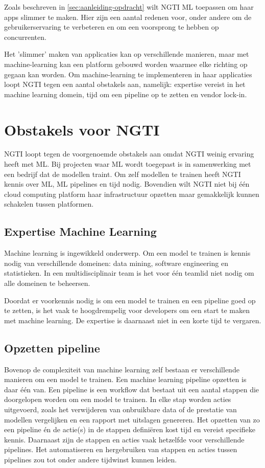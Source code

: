 Zoals beschreven in \autoref{sec:aanleiding-opdracht} wilt NGTI ML toepassen om haar apps slimmer te maken. Hier zijn een aantal redenen voor, onder andere om de gebruikerservaring te verbeteren en om een voorsprong te hebben op concurrenten.

Het 'slimmer' maken van applicaties kan op verschillende manieren, maar met machine-learning kan een platform gebouwd worden waarmee elke richting op gegaan kan worden. Om machine-learning te implementeren in haar applicaties loopt NGTI tegen een aantal obstakels aan, namelijk: expertise vereist in het machine learning domein, tijd om een pipeline op te zetten en vendor lock-in.

\section{Obstakels voor NGTI}\label{sec:obstakels-voor-ngti}
NGTI loopt tegen de voorgenoemde obstakels aan omdat NGTI weinig ervaring heeft met ML. Bij projecten waar ML wordt toegepast is in samenwerking met een bedrijf dat de modellen traint. Om zelf modellen te trainen heeft NGTI kennis over ML, ML pipelines en tijd nodig. Bovendien wilt NGTI niet bij één cloud computing platform haar infrastructuur opzetten maar gemakkelijk kunnen schakelen tussen platformen.

\subsection{Expertise Machine Learning}\label{subsec:expertise-machine-learning}
Machine learning is ingewikkeld onderwerp. Om een model te trainen is kennis nodig van verschillende domeinen: data mining, software engineering en statistieken. In een multidisciplinair team is het voor één teamlid niet nodig om alle domeinen te beheersen.

Doordat er voorkennis nodig is om een model te trainen en een pipeline goed op te zetten, is het vaak te hoogdrempelig voor developers om een start te maken met machine learning. De expertise is daarnaast niet in een korte tijd te vergaren.

\subsection{Opzetten pipeline}\label{subsec:opzetten-pipeline}
Bovenop de complexiteit van machine learning zelf bestaan er verschillende manieren om een model te trainen. Een machine learning pipeline opzetten is daar één van. Een pipeline is een workflow dat bestaat uit een aantal stappen die doorgelopen worden om een model te trainen. In elke stap worden acties uitgevoerd, zoals het verwijderen van onbruikbare data of de prestatie van modellen vergelijken en een rapport met uitslagen genereren. Het opzetten van zo een pipeline én de actie(s) in de stappen definiëren kost tijd en vereist specifieke kennis. Daarnaast zijn de stappen en acties vaak hetzelfde voor verschillende pipelines. Het automatiseren en hergebruiken van stappen en acties tussen pipelines zou tot onder andere tijdwinst kunnen leiden.

